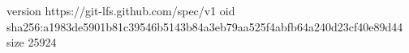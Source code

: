 version https://git-lfs.github.com/spec/v1
oid sha256:a1983de5901b81c39546b5143b84a3eb79aa525f4abfb64a240d23cf40e89d44
size 25924
